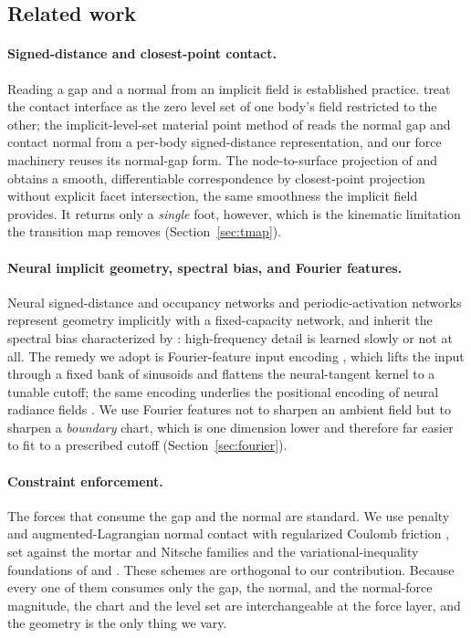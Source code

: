 \subsection{Related work}\label{sec:intro-related}

\paragraph{Signed-distance and closest-point contact.}
Reading a gap and a normal from an implicit field is established practice. \citet{kolev2003level} treat
the contact interface as the zero level set of one body's field restricted to the other; the
implicit-level-set material point method of \citet{liu2020implicit} reads the normal gap and contact
normal from a per-body signed-distance representation, and our force machinery reuses its normal-gap
form. The node-to-surface projection of \citet{zavarise1998segment} and \citet{fischer2005frictionless}
obtains a smooth, differentiable correspondence by closest-point projection without explicit facet
intersection, the same smoothness the implicit field provides. It returns only a \emph{single} foot,
however, which is the kinematic limitation the transition map removes (Section~\ref{sec:tmap}).

\paragraph{Neural implicit geometry, spectral bias, and Fourier features.}
Neural signed-distance and occupancy networks \citep{park2019deepsdf} and periodic-activation networks
\citep{sitzmann2020implicit} represent geometry implicitly with a fixed-capacity network, and inherit the
spectral bias characterized by \citet{rahaman2019spectral}: high-frequency detail is learned slowly or
not at all. The remedy we adopt is Fourier-feature input encoding \citep{tancik2020fourier}, which lifts
the input through a fixed bank of sinusoids and flattens the neural-tangent kernel to a tunable cutoff;
the same encoding underlies the positional encoding of neural radiance fields \citep{mildenhall2020nerf}.
We use Fourier features not to sharpen an ambient field but to sharpen a \emph{boundary} chart, which is
one dimension lower and therefore far easier to fit to a prescribed cutoff (Section~\ref{sec:fourier}).

\paragraph{Constraint enforcement.}
The forces that consume the gap and the normal are standard. We use penalty and augmented-Lagrangian
normal contact with regularized Coulomb friction \citep{wriggers2006computational,alart1991mixed,
simo1992augmented}, set against the mortar \citep{puso2004mortar} and Nitsche \citep{chouly2013nitsche}
families and the variational-inequality foundations of \citet{kikuchi1988contact} and
\citet{laursen2002computational}. These schemes are orthogonal to our contribution. Because every one of
them consumes only the gap, the normal, and the normal-force magnitude, the chart and the level set are
interchangeable at the force layer, and the geometry is the only thing we vary.

